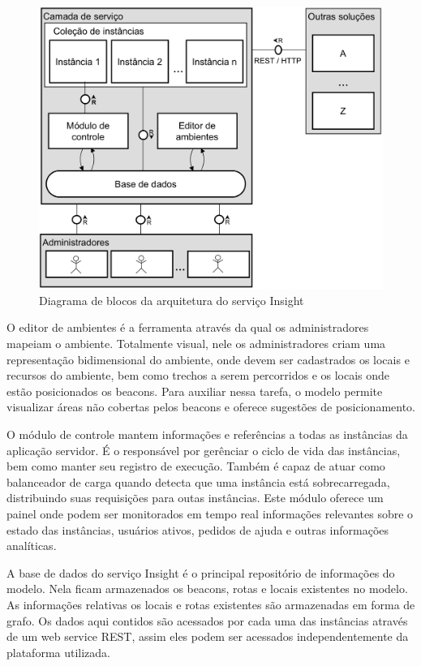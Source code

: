 \documentclass[twoside,english,brazilian]{UNISINOSartigo}
\begin{document}
\begin{figure}[!ht]
	\caption{Diagrama de blocos da arquitetura do serviço Insight}
	\label{fig:arquiteturaServico}
	\centering%
	\begin{minipage}{.7\textwidth}
		\includegraphics[width=\textwidth]{imgs/arquiteturaServico.png}
	\end{minipage}
\end{figure}

O editor de ambientes é a ferramenta através da qual os administradores mapeiam o ambiente. Totalmente visual, nele os administradores criam uma representação bidimensional do ambiente, onde devem ser cadastrados os locais e recursos do ambiente, bem como trechos a serem percorridos e os locais onde estão posicionados os beacons. Para auxiliar nessa tarefa, o modelo permite visualizar áreas não cobertas pelos beacons e oferece sugestões de posicionamento.

O módulo de controle mantem informações e referências a todas as instâncias da aplicação servidor. É o responsável por gerênciar o ciclo de vida das instâncias, bem como manter seu registro de execução. Também é capaz de atuar como balanceador de carga quando detecta que uma instância está sobrecarregada, distribuindo suas requisições para outas instâncias. Este módulo oferece um painel onde podem ser monitorados em tempo real informações relevantes sobre o estado das instâncias, usuários ativos, pedidos de ajuda e outras informações analíticas.

A base de dados do serviço Insight é o principal repositório de informações do modelo. Nela ficam armazenados os beacons, rotas e locais existentes no modelo. As informações relativas os locais e rotas existentes são armazenadas em forma de grafo. Os dados aqui contidos são acessados por cada uma das instâncias através de um web service REST, assim eles podem ser acessados independentemente da plataforma utilizada.
\end{document}
